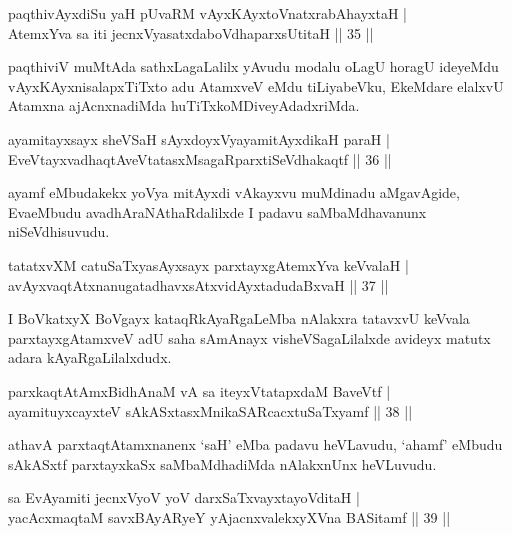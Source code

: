 
\begin{shl}
paqthivAyxdiSu yaH pUvaRM vAyxKAyxtoV\s natxrabAhayxtaH |\\
AtemxYva sa iti jecnxVyasatxdaboVdhaparxsUtitaH \hfill || 35 ||
\end{shl}

\begin{artha}
paqthiviV muMtAda sathxLagaLalilx yAvudu modalu oLagU horagU ideyeMdu
vAyxKAyxnisalapxTiTxto adu AtamxveV eMdu tiLiyabeVku, EkeMdare elalxvU
Atamxna ajAcnxnadiMda huTiTxkoMDiveyAdadxriMda.
\end{artha}

\begin{shl}
ayamitayxsayx sheVSaH sAyxdoyxVya\s yamitAyxdikaH paraH |\\
EveVtayxvadhaqtAveVtatasxMsagaRparxtiSeVdhakaqtf \hfill || 36 ||
\end{shl}

\begin{artha}
ayamf eMbudakekx yoV\s ya mitAyxdi vAkayxvu muMdinadu aMgavAgide, EvaeMbudu avadhAraNAthaRdalilxde I padavu saMbaMdhavanunx niSeVdhisuvudu.
\end{artha}

\begin{shl}
tatatxvXM catuSaTxyasAyxsayx parxtayxgAtemxYva keVvalaH |\\
avAyxvaqtAtxnanugatadhavxsAtxvidAyxtadudaBxvaH \hfill || 37 ||
\end{shl}

\begin{artha}
I BoVkatxyX BoVgayx kataqRkAyaRgaLeMba nAlakxra tatavxvU keVvala parxtayxgAtamxveV adU saha sAmAnayx visheVSagaLilalxde avideyx matutx adara kAyaRgaLilalxdudx.
\end{artha}

\begin{shl}
parxkaqtAtAmxBidhAnaM vA sa iteyxVtatapxdaM BaveVtf |\\
ayamituyxcayxteV sAkASxtasxMnikaSARcacxtuSaTxyamf \hfill || 38 ||
\end{shl}

\begin{artha}
athavA parxtaqtAtamxnanenx `saH' eMba padavu heVLavudu, `ahamf'
eMbudu sAkASxtf parxtayxkaSx saMbaMdhadiMda nAlakxnUnx heVLuvudu.
\end{artha}

\begin{shl}
sa EvAyamiti jecnxVyoV yoV darxSaTxvayxtayoVditaH |\\
yacAcxmaqtaM savxBAyARyeY yAjacnxvalekxyXVna BASitamf \hfill || 39 ||
\end{shl}


